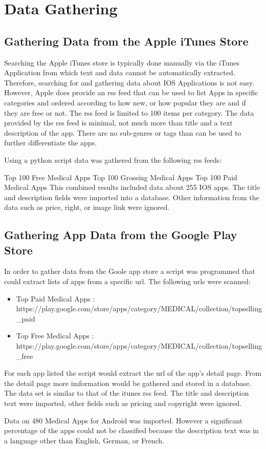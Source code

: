 \section{Data Gathering}

\subsection{Gathering Data from the Apple iTunes Store}

Searching the Apple iTunes store is typically done manually via the iTunes Application from which text and data cannot be automatically extracted. Therefore, searching for and gathering data about IOS Applications is not easy. However, Apple does provide an rss feed that can be used to list Apps in specific categories and ordered according to how new, or how popular they are and if they are free or not. The rss feed is limited to 100 items per category. The data provided by the rss feed is minimal, not much more than title and a text description of the app. There are no sub-genres or tags than can be used to further differentiate the apps.

Using a python script data was gathered from the following rss feeds:

Top 100 Free Medical Apps
Top 100 Grossing Medical Apps
Top 100 Paid Medical Apps
This combined results included data about 255 IOS apps. The title and description fields were imported into a database. Other information from the data such as price, right, or image link were ignored.


\subsection{Gathering App Data from the Google Play Store}

In order to gather data from the Goole app store a script was programmed that could extract lists of apps from a specific url. The following urls were scanned:
\noindent
\begin{itemize}
\item Top Paid Medical Apps : https://play.google.com/store/apps/category/MEDICAL/collection/topselling\_paid

\item Top Free Medical Apps : https://play.google.com/store/apps/category/MEDICAL/collection/topselling\_free
\end{itemize}

For each app listed the script would extract the url of the app's detail page. From the detail page more imformation would be gathered and stored in a database. The data set is similar to that of the itunes rss feed. The title and description text were imported, other fields such as pricing and copyright were ignored.

Data on 480 Medical Apps for Android was imported. However a significant percentage of the apps could not be classified because the description text was in a language other than English, German, or French.